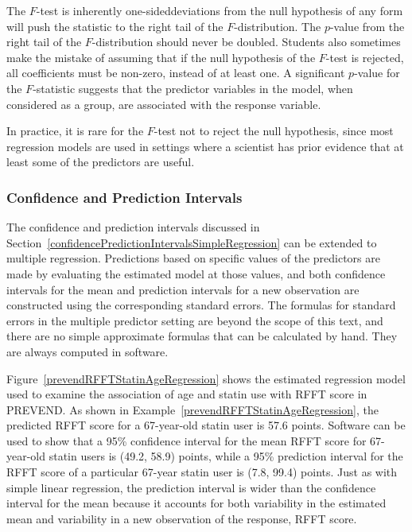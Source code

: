 The $F$-test is inherently one-sided\textemdash deviations from the null hypothesis of any form will push the statistic to the right tail of the $F$-distribution.  The $p$-value from the right tail of the $F$-distribution should never be doubled.  Students also sometimes make the mistake of assuming that if the null hypothesis of the $F$-test is rejected, all coefficients must be non-zero, instead of at least one. A significant $p$-value for the $F$-statistic suggests that the predictor variables in the model, when considered as a group, are associated with the response variable.

In practice, it is rare for the $F$-test not to reject the null hypothesis, since most regression models are used in settings where a scientist has prior evidence that at least some of the predictors are useful.

\subsubsection{Confidence and Prediction Intervals}


The confidence and prediction intervals discussed in Section~\ref{confidencePredictionIntervalsSimpleRegression} can be extended to multiple regression. Predictions based on specific values of the predictors are made by evaluating the estimated model at those values, and both confidence intervals for the mean and prediction intervals for a new observation are constructed using the corresponding standard errors.  The formulas for standard errors in the multiple predictor setting are beyond the scope of this text, and there are no simple approximate formulas that can be calculated by hand.  They are always computed in software. 

Figure~\ref{prevendRFFTStatinAgeRegression} shows the estimated regression model used to examine the association of age and statin use with RFFT score in PREVEND. As shown in Example~\ref{prevendRFFTStatinAgeRegression}, the predicted RFFT score for a 67-year-old statin user is 57.6 points. Software can be used to show that a 95\% confidence interval for the mean RFFT score for 67-year-old statin users is (49.2, 58.9) points,  while a 95\% prediction interval for the RFFT score of a particular 67-year statin user is (7.8, 99.4) points.  Just as with simple linear regression, the prediction interval is wider than the confidence interval for the mean because it accounts for both variability in the estimated mean and variability in a new observation of the response, RFFT score.


